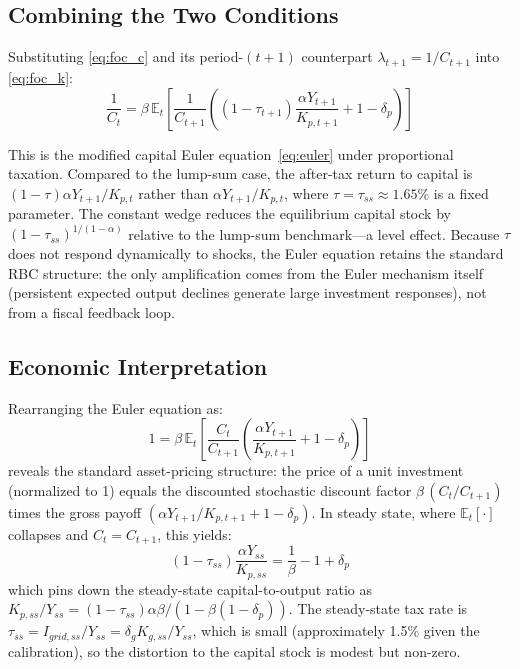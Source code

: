 \documentclass[12pt, a4paper]{article}
\begin{document}
\subsection*{Combining the Two Conditions}

Substituting \eqref{eq:foc_c} and its period-$(t+1)$ counterpart $\lambda_{t+1} = 1/C_{t+1}$ into \eqref{eq:foc_k}:
\begin{equation*}
\frac{1}{C_t} = \beta\,\mathbb{E}_t\!\left[\frac{1}{C_{t+1}}
\left((1-\tau_{t+1})\frac{\alpha Y_{t+1}}{K_{p,t+1}} + 1 - \delta_p\right)\right]
\end{equation*}

This is the modified capital Euler equation~\eqref{eq:euler} under proportional taxation. Compared to the lump-sum case, the after-tax return to capital is $(1-\tau)\alpha Y_{t+1}/K_{p,t}$ rather than $\alpha Y_{t+1}/K_{p,t}$, where $\tau = \tau_{ss} \approx 1.65\%$ is a fixed parameter. The constant wedge reduces the equilibrium capital stock by $(1-\tau_{ss})^{1/(1-\alpha)}$ relative to the lump-sum benchmark---a level effect. Because $\tau$ does not respond dynamically to shocks, the Euler equation retains the standard RBC structure: the only amplification comes from the Euler mechanism itself (persistent expected output declines generate large investment responses), not from a fiscal feedback loop.

\subsection*{Economic Interpretation}

Rearranging the Euler equation as:
\begin{equation*}
1 = \beta\,\mathbb{E}_t\!\left[\frac{C_t}{C_{t+1}}
\left(\frac{\alpha Y_{t+1}}{K_{p,t+1}} + 1 - \delta_p\right)\right]
\end{equation*}
reveals the standard asset-pricing structure: the price of a unit investment (normalized to 1) equals the discounted stochastic discount factor $\beta\,(C_t/C_{t+1})$ times the gross payoff $(\alpha Y_{t+1}/K_{p,t+1} + 1 - \delta_p)$. In steady state, where $\mathbb{E}_t[\cdot]$ collapses and $C_t = C_{t+1}$, this yields:
\begin{equation*}
(1-\tau_{ss})\frac{\alpha Y_{ss}}{K_{p,ss}} = \frac{1}{\beta} - 1 + \delta_p
\end{equation*}
which pins down the steady-state capital-to-output ratio as $K_{p,ss}/Y_{ss} = (1-\tau_{ss})\alpha\beta/(1 - \beta(1-\delta_p))$. The steady-state tax rate is $\tau_{ss} = I_{grid,ss}/Y_{ss} = \delta_g K_{g,ss}/Y_{ss}$, which is small (approximately 1.5\% given the calibration), so the distortion to the capital stock is modest but non-zero.
\end{document}

